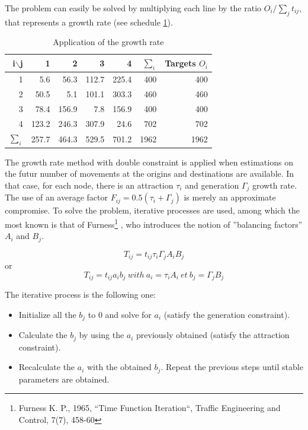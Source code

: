 The problem can easily be solved by multiplying each line by the ratio
$O_i/\sum\limits_jt_{ij}$, that represents a growth rate (see schedule
\ref{tab2_2}).

\begin{table}[htbp]
\begin{center}
\begin{tabular}{rrrrrrr}
\hline
i$\backslash$j & 1 & 2 & 3 & 4 & $\sum\limits_{i}$ & Targets $O_i$\\
\hline
1 & 5.6 & 56.3 & 112.7 & 225.4 & 400 & 400\\

2 & 50.5 & 5.1 & 101.1 & 303.3 & 460 & 460\\

3 & 78.4 & 156.9 & 7.8 & 156.9 & 400 & 400\\

4 & 123.2 & 246.3 & 307.9 & 24.6 & 702 & 702\\

$\sum\limits_{i}$ & 257.7 & 464.3 & 529.5 & 701.2 & 1962 & 1962\\
\hline
\end{tabular}
\caption{\label{tab2_2} Application of the growth rate}
\end{center}
\end{table}



The growth rate method with double constraint is applied when estimations on the
futur number of movements at the origins and destinations are available. In that
case, for each node, there is an attraction $\tau_i$ and generation
$\Gamma_j$ growth rate. The use of an average factor $F_{ij}=0.5(\tau_i+\Gamma_j)$ is
merely an approximate compromise.  To solve the problem, iterative processes are
used, among which the most known is that of Furness\footnote{Furness K. P.,
1965, ``Time Function Iteration``, Traffic Engineering and Control, 7(7),
458-60} , who introduces the notion of ''balancing factors'' $A_i$ and $B_j$.



\begin{center}
$$T_{ij} = t_{ij}\tau_i\Gamma_jA_iB_j$$
or
$$T_{ij} = t_{ij}a_ib_j ~with~ a_i = \tau_iA_i ~et~ b_j = \Gamma_jB_j$$
\end{center}


The iterative process is the following one:

\begin{itemize}
\item Initialize all the $b_j$ to 0 and solve for $a_i$ (satisfy the generation constraint).
\item Calculate the $b_j$ by using the $a_i$ previously obtained (satisfy the
attraction constraint).
\item Recalculate the $a_i$ with the obtained $b_j$.  Repeat the previous steps
until stable parameters are obtained.%
\end{itemize}


